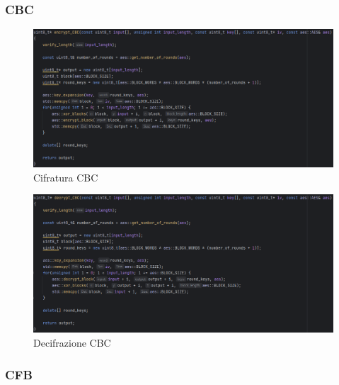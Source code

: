 \subsubsection{CBC}

\textsf{\small } %

\begin{figure}[H]
	\centering
	\includegraphics[width=1\textwidth, height=1\textheight, keepaspectratio]{./images/code/cpp/modes/encrypt_CBC.PNG}
	\caption{Cifratura CBC}
	\label{fig:encrypt_CBC}
\end{figure}

\textsf{\small } %

\begin{figure}[H]
	\centering
	\includegraphics[width=1\textwidth, height=1\textheight, keepaspectratio]{./images/code/cpp/modes/decrypt_CBC.PNG}
	\caption{Decifrazione CBC}
	\label{fig:decrypt_CBC}
\end{figure}

\subsubsection{CFB}

\textsf{\small } %

